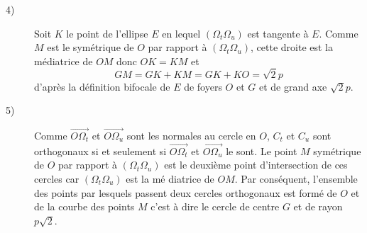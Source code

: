 \begin{description}
\begin{description}
\item[4)]  Soit $K$ le point de l'ellipse $E$ en lequel $(\Omega _{t}\Omega
_{u})$ est tangente \`{a} $E$. Comme $M$ est le sym\'{e}trique de $O$ par
rapport \`{a} $(\Omega _{t}\Omega _{u})$, cette droite est la m\'{e}diatrice
de $OM$ donc $OK=KM$ et 
\[
GM=GK+KM=GK+KO=\sqrt{2}p
\]
d'apr\`{e}s la d\'{e}finition bifocale de $E$ de foyers $O$ et $G$ et de
grand axe $\sqrt{2}p$.

\item[5)]  Comme $\overrightarrow{O\Omega _{t}}$ et $\overrightarrow{O\Omega
_{u}}$ sont les normales au cercle en $O$, $C_{t}$ et $C_{u}$ sont
orthogonaux si et seulement si $\overrightarrow{O\Omega _{t}}$ et $%
\overrightarrow{O\Omega _{u}}$ le sont$.$ Le point $M$ sym\'{e}trique de $O$
par rapport \`{a} $(\Omega _{t}\Omega _{u})$ est le deuxi\`{e}me point
d'intersection de ces cercles car $(\Omega _{t}\Omega _{u})$ est la m\'{e}%
diatrice de $OM$. Par cons\'{e}quent, l'ensemble des points par lesquels
passent deux cercles orthogonaux est form\'{e} de $O$ et de la courbe des
points $M$ c'est \`{a} dire le cercle de centre $G$ et de rayon $p\sqrt{2}$.
\end{description}
\end{description}
